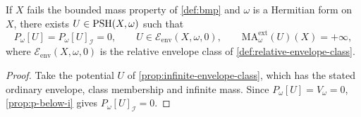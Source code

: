 \begin{proposition}\label{prop:goodness-infinite-mass}
If $X$ fails the bounded mass property of \cref{def:bmp} and $\omega$ is a Hermitian form on $X$, there exists $U\in\mathrm{PSH}(X,\omega)$ such that
\[
 P_\omega[U]=P_\omega[U]_{\mathcal I}=0,
 \qquad U\in\mathcal E_{\mathrm{env}}(X,\omega,0),
 \qquad \mathrm{MA}^{\mathrm{ext}}_\omega(U)(X)=+\infty,
\]
where $\mathcal E_{\mathrm{env}}(X,\omega,0)$ is the relative envelope class of \cref{def:relative-envelope-class}.
\end{proposition}
\begin{proof}
Take the potential $U$ of \cref{prop:infinite-envelope-class}, which has the stated ordinary envelope, class membership and infinite mass. Since $P_\omega[U]=V_\omega=0$, \cref{prop:p-below-i} gives $P_\omega[U]_{\mathcal I}=0$.
\end{proof}








